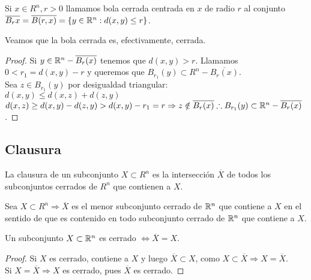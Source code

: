 \begin{definition}
  Si $x \in R^n, r > 0$ llamamos bola cerrada centrada en $x$ de radio $r$ al conjunto $\overline{B_r{x}} = \overline{B(r, x)} = \{ y \in \mathbb{R}^n : d(x, y) \leq r \}$.
\end{definition}

\begin{prop}
  Veamos que la bola cerrada es, efectivamente, cerrada.
  \begin{proof}
    Si $y \in \mathbb{R}^n - \overline{B_r(x)}$ tenemos que $d(x, y) > r$. Llamamos $0 < r_1 = d(x, y) - r$ y queremos que $B_{r_1}(y) \subset R^n - \overline{B_r(x)}$. \\
    Sea $z \in B_{r_1}(y)$ por desigualdad triangular: \\
    $d(x, y) \leq d(x, z) + d(z, y)$ \\
    $d(x, z) \geq d(x, y) - d(z, y) > d(x, y) - r_1 = r \Rightarrow z \notin \overline{B_r(x)} \therefore B_{r_1}(y) \subset \mathbb{R}^n - \overline{B_r(x)}$.
  \end{proof}
\end{prop}

\subsection{Clausura}

\begin{definition}[Clausura]
  La clausura de un subconjunto $X \subset R^n$ es la intersección $\overline{X}$ de todos los subconjuntos cerrados de $R^n$ que contienen a $X$.
\end{definition}

\begin{prop}
  Sea $X \subset R^n \Rightarrow \overline{X}$ es el menor subconjunto cerrado de $\mathbb{R}^n$ que contiene a $X$ en el sentido de que es contenido en todo subconjunto cerrado de $\mathbb{R}^n$ que contiene a $X$. 
\end{prop}

\begin{corollary}
  Un subconjunto $X \subset \mathbb{R}^n$ es cerrado $\iff \overline{X} = X$.
  \begin{proof}
    Si $X$ es cerrado, contiene a $X$ y luego $\overline{X} \subset X$, como $X \subset \overline{X} \Rightarrow X = \overline{X}$. \\
    Si $X = \overline{X} \Rightarrow X$ es cerrado, pues $\overline{X}$ es cerrado.
  \end{proof}
\end{corollary}

